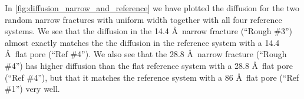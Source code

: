 In \cref{fig:diffusion_narrow_and_reference} we have plotted the diffusion for the two random narrow fractures with uniform width together with all four reference systems. We see that the diffusion in the 14.4 \AA\ narrow fracture (``Rough \#3'') almost exactly matches the the diffusion in the reference system with a 14.4 \AA\ flat pore (``Ref \#4''). We also see that the 28.8 \AA\ narrow fracture (``Rough \#4'') has higher diffusion than the flat reference system with a 28.8 \AA\ flat pore (``Ref \#4''), but that it matches the reference system with a 86 \AA\ flat pore (``Ref \#1'') very well.
%
%
